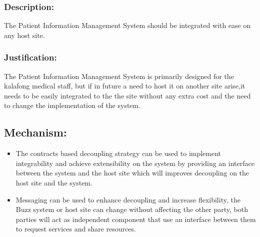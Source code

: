 
\subsubsection*{Description:}
	  The Patient Information Management System should be integrated with ease on any host site.
	 \subsubsection*{Justification:}
	   The Patient Information Management System is primarily designed for the kalafong medical staff, but if in future a need to host it on another site arise,it needs to be easily integrated to the the site without any extra cost and the need  to change the implementation of the system.
	\subsection*{Mechanism:}
	\begin{itemize}
		\item The contracts based decoupling strategy can be used to implement integrability and achieve extensibility on the system by providing an interface between the system and the host site which will improves decoupling on the host site and the system.    
		\item Messaging can be used to enhance decoupling and increase flexibility, the Buzz system or host site can change without affecting the other party, both parties will act as independent component that use an interface between them to request services and share resources.  
	\end{itemize}
